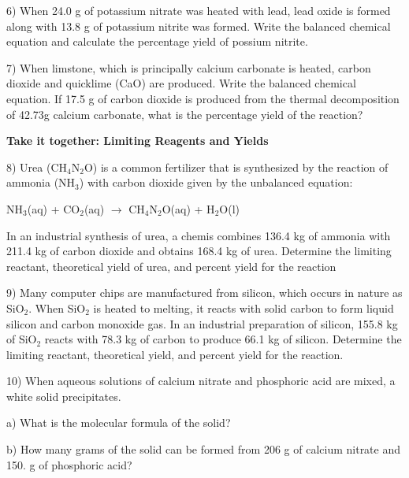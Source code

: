 \documentclass[12pt]{article}
\begin{document}
6) When 24.0 g of potassium nitrate was heated with lead, lead oxide
is formed along with 13.8 g of potassium nitrite was formed. Write the
balanced chemical equation and calculate the percentage yield of possium
nitrite.

7) When limstone, which is principally calcium carbonate is heated,
carbon dioxide and quicklime (CaO) are produced. Write the balanced
chemical equation. If 17.5 g of carbon dioxide is produced from the
thermal decomposition of 42.73g calcium carbonate, what is the percentage
yield of the reaction?

\textbf{Take it together: Limiting Reagents and Yields}

8) Urea (CH$_4$N$_2$O) is a common fertilizer that is synthesized by
the reaction of ammonia (NH$_3$) with carbon dioxide given by the
unbalanced equation:

NH$_3$(aq) + CO$_2$(aq) $\rightarrow$ CH$_4$N$_2$O(aq) + H$_2$O(l)

In an industrial synthesis of urea, a chemis combines 136.4 kg of
ammonia with 211.4 kg of carbon dioxide and obtains 168.4 kg of
urea. Determine the limiting reactant, theoretical yield of urea,
and percent yield for the reaction

9) Many computer chips are manufactured from silicon, which occurs
in nature as SiO$_2$. When SiO$_2$ is heated to melting, it reacts
with solid carbon to form liquid silicon and carbon monoxide gas.
In an industrial preparation of silicon, 155.8 kg of SiO$_2$ reacts
with 78.3 kg of carbon to produce 66.1 kg of silicon. Determine
the limiting reactant, theoretical yield, and percent yield for the
reaction.

10) When aqueous solutions of calcium nitrate and phosphoric acid are
mixed, a white solid precipitates.

a) What is the molecular formula of the solid?

b) How many grams of the solid can be formed from 206 g of calcium
nitrate and 150. g of phosphoric acid?
\end{document}
